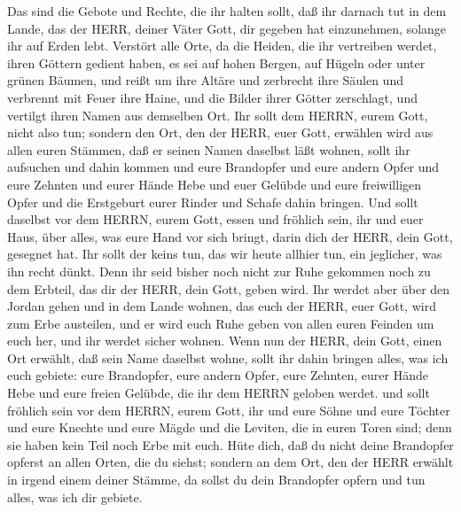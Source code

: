  Das sind die Gebote und Rechte, die ihr halten sollt, daß
ihr darnach tut in dem Lande, das der HERR, deiner Väter Gott, dir
gegeben hat einzunehmen, solange ihr auf Erden lebt. 
Verstört alle Orte, da die Heiden, die ihr vertreiben werdet, ihren
Göttern gedient haben, es sei auf hohen Bergen, auf Hügeln oder unter
grünen Bäumen,  und reißt um ihre Altäre und zerbrecht ihre
Säulen und verbrennt mit Feuer ihre Haine, und die Bilder ihrer Götter
zerschlagt, und vertilgt ihren Namen aus demselben Ort.  Ihr
sollt dem HERRN, eurem Gott, nicht also tun;  sondern den
Ort, den der HERR, euer Gott, erwählen wird aus allen euren Stämmen, daß
er seinen Namen daselbst läßt wohnen, sollt ihr aufsuchen und dahin
kommen  und eure Brandopfer und eure andern Opfer und eure
Zehnten und eurer Hände Hebe und euer Gelübde und eure freiwilligen
Opfer und die Erstgeburt eurer Rinder und Schafe dahin bringen.
 Und sollt daselbst vor dem HERRN, eurem Gott, essen und
fröhlich sein, ihr und euer Haus, über alles, was eure Hand vor sich
bringt, darin dich der HERR, dein Gott, gesegnet hat.  Ihr
sollt der keins tun, das wir heute allhier tun, ein jeglicher, was ihn
recht dünkt.  Denn ihr seid bisher noch nicht zur Ruhe
gekommen noch zu dem Erbteil, das dir der HERR, dein Gott, geben wird.
 Ihr werdet aber über den Jordan gehen und in dem Lande
wohnen, das euch der HERR, euer Gott, wird zum Erbe austeilen, und er
wird euch Ruhe geben von allen euren Feinden um euch her, und ihr werdet
sicher wohnen.  Wenn nun der HERR, dein Gott, einen Ort
erwählt, daß sein Name daselbst wohne, sollt ihr dahin bringen alles,
was ich euch gebiete: eure Brandopfer, eure andern Opfer, eure Zehnten,
eurer Hände Hebe und eure freien Gelübde, die ihr dem HERRN geloben
werdet.  und sollt fröhlich sein vor dem HERRN, eurem Gott,
ihr und eure Söhne und eure Töchter und eure Knechte und eure Mägde und
die Leviten, die in euren Toren sind; denn sie haben kein Teil noch Erbe
mit euch.  Hüte dich, daß du nicht deine Brandopfer opferst
an allen Orten, die du siehst;  sondern an dem Ort, den der
HERR erwählt in irgend einem deiner Stämme, da sollst du dein Brandopfer
opfern und tun alles, was ich dir gebiete.

